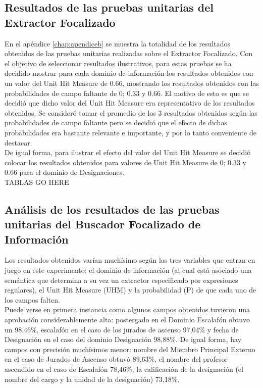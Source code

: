 \subsection{Resultados de las pruebas unitarias del Extractor Focalizado}

En el apéndice \ref{chap:apendiceb} se muestra la totalidad de los resultados obtenidos de las pruebas unitarias realizadas sobre el Extractor Focalizado. Con el objetivo de seleccionar resultados ilustrativos, para estas pruebas se ha decidido mostrar para cada dominio de información los resultados obtenidos con un valor del Unit Hit Measure de 0.66, mostrando los resultados obtenidos con las probabilidades de campo faltante de 0; 0.33 y 0.66. El motivo de esto es que se decidió que dicho valor del Unit Hit Measure era representativo de los resultados obtenidos. Se consideró tomar el promedio de los 3 resultados obtenidos según las probabilidades de campo faltante pero se decidió que el efecto de dichas probabilidades era bastante relevante e importante, y por lo tanto conveniente de destacar.\\

De igual forma, para ilustrar el efecto del valor del Unit Hit Measure se decidió colocar los resultados obtenidos para valores de Unit Hit Measure de 0; 0.33 y 0.66 para el dominio de Designaciones.\\

TABLAS GO HERE\\



\subsection{Análisis de los resultados de las pruebas unitarias del Buscador Focalizado de Información}

Los resultados obtenidos varían muchísimo según las tres variables que entran en juego en este experimento: el dominio de información (al cual está asociado una semántica que determina a su vez un extractor especificado por expresiones regulares), el Unit Hit Measure (UHM) y la probabilidad (P) de que cada uno de los campos falten.\\

Puede verse en primera instancia como algunos campos obtenidos tuvieron una aprobación considerablemente alta: postergado en el Dominio Escalafón obtuvo un 98.46\%, escalafón en el caso de los jurados de ascenso 97,04\% y fecha de Designación en el caso del dominio Designación 98,88\%. De igual forma, hay campos con precisión muchísimos menor: nombre del Miembro Principal Externo en el caso de Jurados de Ascenso obtuvó 89,63\%, el nombre del profesor ascendido en el caso de Escalafón 78,46\%, la calificación de la designación (el nombre del cargo y la unidad de la designación) 73,18\%. \\

